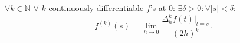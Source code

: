 \documentclass[a4paper,12pt]{article}
\begin{document}


\begin{theorem}
    $\forall k \in \mathbb{N}$ $\forall$  $k$-continuously differentiable $f$'s at $0$:
    $\exists \delta>0: \forall |s|<\delta: $
    \begin{equation}
        f^{(k)}(s) = \lim_{h \to 0} \frac{\Delta^{k}_{h} f(t)|_{t=s}}{(2h)^{k}}.
    \end{equation}
\end{theorem}
\end{document}
